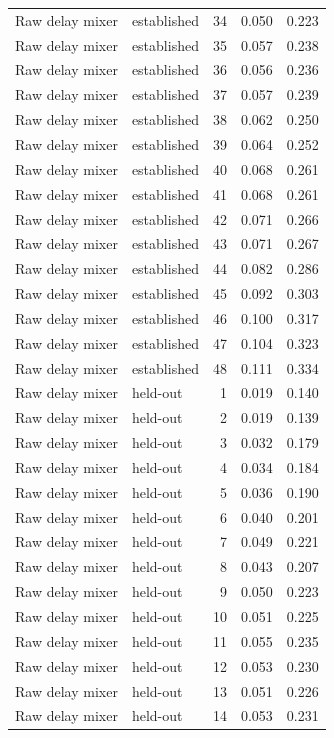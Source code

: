 \begin{tabular}{llrrr}
Raw delay mixer & established & 34 & 0.050 & 0.223 \\
Raw delay mixer & established & 35 & 0.057 & 0.238 \\
Raw delay mixer & established & 36 & 0.056 & 0.236 \\
Raw delay mixer & established & 37 & 0.057 & 0.239 \\
Raw delay mixer & established & 38 & 0.062 & 0.250 \\
Raw delay mixer & established & 39 & 0.064 & 0.252 \\
Raw delay mixer & established & 40 & 0.068 & 0.261 \\
Raw delay mixer & established & 41 & 0.068 & 0.261 \\
Raw delay mixer & established & 42 & 0.071 & 0.266 \\
Raw delay mixer & established & 43 & 0.071 & 0.267 \\
Raw delay mixer & established & 44 & 0.082 & 0.286 \\
Raw delay mixer & established & 45 & 0.092 & 0.303 \\
Raw delay mixer & established & 46 & 0.100 & 0.317 \\
Raw delay mixer & established & 47 & 0.104 & 0.323 \\
Raw delay mixer & established & 48 & 0.111 & 0.334 \\
Raw delay mixer & held-out & 1 & 0.019 & 0.140 \\
Raw delay mixer & held-out & 2 & 0.019 & 0.139 \\
Raw delay mixer & held-out & 3 & 0.032 & 0.179 \\
Raw delay mixer & held-out & 4 & 0.034 & 0.184 \\
Raw delay mixer & held-out & 5 & 0.036 & 0.190 \\
Raw delay mixer & held-out & 6 & 0.040 & 0.201 \\
Raw delay mixer & held-out & 7 & 0.049 & 0.221 \\
Raw delay mixer & held-out & 8 & 0.043 & 0.207 \\
Raw delay mixer & held-out & 9 & 0.050 & 0.223 \\
Raw delay mixer & held-out & 10 & 0.051 & 0.225 \\
Raw delay mixer & held-out & 11 & 0.055 & 0.235 \\
Raw delay mixer & held-out & 12 & 0.053 & 0.230 \\
Raw delay mixer & held-out & 13 & 0.051 & 0.226 \\
Raw delay mixer & held-out & 14 & 0.053 & 0.231 \\

\end{tabular}
